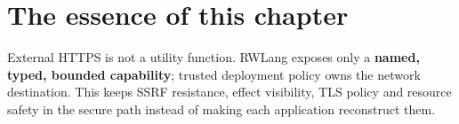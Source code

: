 \section{The essence of this chapter}

External HTTPS is not a utility function. RWLang exposes only a \textbf{named, typed, bounded capability}; trusted deployment policy owns the network destination. This keeps SSRF resistance, effect visibility, TLS policy and resource safety in the secure path instead of making each application reconstruct them.
